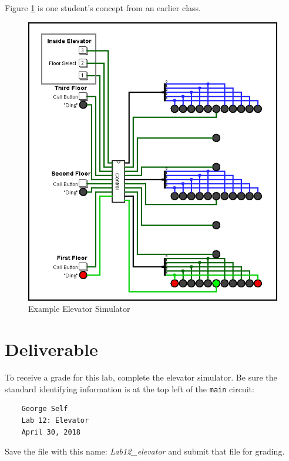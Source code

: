 Figure \ref{fig:13-01} is one student's concept from an earlier class. 

\begin{figure}[H]
	\centering
	\includegraphics[width=\maxwidth{.95\linewidth}]{gfx/13-01}
	\caption{Example Elevator Simulator}
	\label{fig:13-01}
\end{figure}

\section{Deliverable}

To receive a grade for this lab, complete the elevator simulator. Be sure the standard identifying information is at the top left of the \lstinline{main} circuit: 

\bigskip
\begin{minipage}{\linewidth}
	\begin{verbatim}
	George Self
	Lab 12: Elevator
	April 30, 2018
	\end{verbatim}
\end{minipage}
\bigskip

Save the file with this name: \textit{Lab12\_elevator} and submit that file for grading.